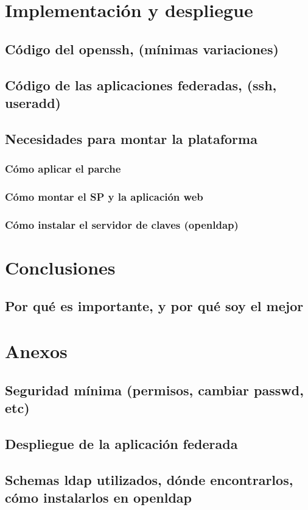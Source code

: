 

\tableofcontents








\chapter{Implementación y despliegue}
    \label{implementacion}
    \section{Código del openssh, (mínimas variaciones)}
    \section{Código de las aplicaciones federadas, (ssh, useradd)}
    \section{Necesidades para montar la plataforma}
        \subsection{Cómo aplicar el parche}
        \subsection{Cómo montar el SP y la aplicación web}
        \subsection{Cómo instalar el servidor de claves (openldap)}


\chapter{Conclusiones}
    \section{Por qué es importante, y por qué soy el mejor}



\chapter{Anexos}
    \section{Seguridad mínima (permisos, cambiar passwd, etc)}
    \section{Despliegue de la aplicación federada}
    \section{Schemas ldap utilizados, dónde encontrarlos, cómo instalarlos
    en openldap}

\newpage



